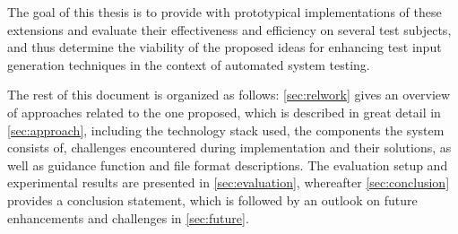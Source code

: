 The goal of this thesis is to provide \xmlmate with prototypical implementations of these extensions and
evaluate their effectiveness and efficiency on several test subjects, and thus determine the viability of the
proposed ideas for enhancing test input generation techniques in the context of automated system testing.

The rest of this document is organized as follows: \cref{sec:relwork} gives an overview of approaches related
to the one proposed, which is described in great detail in \cref{sec:approach}, including the technology stack
used, the components the system consists of, challenges encountered during implementation and their solutions,
as well as guidance function and file format descriptions. The evaluation setup and experimental results are
presented in \cref{sec:evaluation}, whereafter \cref{sec:conclusion} provides a conclusion statement, which is
followed by an outlook on future enhancements and challenges in \cref{sec:future}.